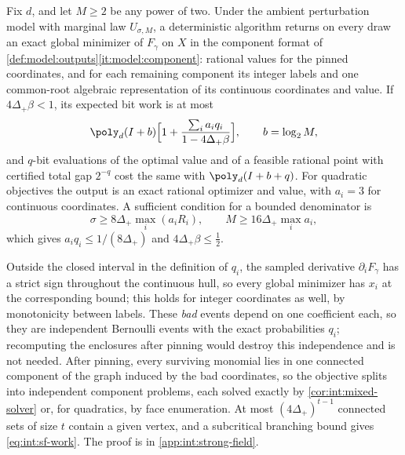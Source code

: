 \begin{theorem}\label{thm:int:strong-field}
Fix $d$, and let $M\ge2$ be any power of two. Under the ambient perturbation
model with marginal law $U_{\sigma,M}$, a deterministic algorithm returns on
every draw an exact global minimizer of $F_\gamma$ on $X$ in the component
format of \cref{def:model:outputs}\ref{it:model:component}: rational values
for the pinned coordinates, and for each remaining component its integer labels
and one common-root algebraic representation of its continuous coordinates and
value. If $4\Delta_+\beta<1$, its expected bit work is at most
\begin{equation}\label{eq:int:sf-work}
 \poly_d(I+b)\Bigl[1+\frac{\sum_ia_iq_i}{1-4\Delta_+\beta}\Bigr],\qquad b=\log_2M,
\end{equation}
and $q$-bit evaluations of the optimal value and of a feasible rational point
with certified total gap $2^{-q}$ cost the same with $\poly_d(I+b+q)$. For
quadratic objectives the output is an exact rational optimizer and value, with
$a_i=3$ for continuous coordinates. A sufficient condition for a bounded
denominator is
\begin{equation}\label{eq:int:sf-regime}
 \sigma\ge8\Delta_+\max_i(a_iR_i),\qquad M\ge16\Delta_+\max_ia_i,
\end{equation}
which gives $a_iq_i\le1/(8\Delta_+)$ and $4\Delta_+\beta\le\frac12$.
\end{theorem}

Outside the closed interval in the definition of $q_i$, the sampled
derivative $\partial_iF_\gamma$ has a strict sign throughout the continuous
hull, so every global minimizer has $x_i$ at the corresponding bound; this
holds for integer coordinates as well, by monotonicity between labels. These
\emph{bad} events depend on one coefficient each, so they are independent
Bernoulli events with the exact probabilities $q_i$; recomputing the
enclosures after pinning would destroy this independence and is not needed.
After pinning, every surviving monomial lies in one connected component of the
graph induced by the bad coordinates, so the objective splits into independent
component problems, each solved exactly by \cref{cor:int:mixed-solver} or, for
quadratics, by face enumeration. At most $(4\Delta_+)^{t-1}$ connected sets of
size $t$ contain a given vertex, and a subcritical branching bound gives
\eqref{eq:int:sf-work}. The proof is in \cref{app:int:strong-field}.

